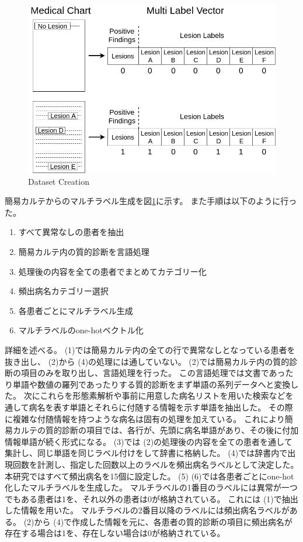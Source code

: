 \begin{figure}[tb]
    \begin{center}
        \includegraphics[width=150mm]{./fig/ieice1.png}
        \caption{Dataset Creation}
        \label{fig:multilabel}
    \end{center}
\end{figure}

簡易カルテからのマルチラベル生成を図\ref{fig:multilabel}に示す。
また手順は以下のように行った。

\begin{enumerate}
    \item すべて異常なしの患者を抽出
    \item 簡易カルテ内の質的診断を言語処理
    \item 処理後の内容を全ての患者でまとめてカテゴリー化
    \item 頻出病名カテゴリー選択
    \item 各患者ごとにマルチラベル生成
    \item マルチラベルのone-hotベクトル化
\end{enumerate}

詳細を述べる。
 (1)では簡易カルテ内の全ての行で異常なしとなっている患者を抜き出し、 (2)から (4)の処理には通していない。
 (2)では簡易カルテ内の質的診断の項目のみを取り出し、言語処理を行った。
この言語処理では文書であったり単語や数値の羅列であったりする質的診断をまず単語の系列データへと変換した。
次にこれらを形態素解析\cite{MeCab}や事前に用意した病名リストを用いた検索などを通して病名を表す単語とそれらに付随する情報を示す単語を抽出した。
その際に複雑な付随情報を持つような病名は固有の処理を加えている。
これにより簡易カルテの質的診断の項目では、各行が、先頭に病名単語があり、その後に付加情報単語が続く形式になる。
(3)では (2)の処理後の内容を全ての患者を通して集計し、同じ単語を同じラベル付けをして辞書に格納した。 
(4)では辞書内で出現回数を計測し、指定した回数以上のラベルを頻出病名ラベルとして決定した。
本研究ではすべて頻出病名を15個に設定した。
 (5) (6)では各患者ごとにone-hot化したマルチラベルを生成した。
マルチラベルの1番目のラベルには異常が一つでもある患者は1を、それ以外の患者は0が格納されている。
これには (1)で抽出した情報を用いた。
マルチラベルの2番目以降のラベルには頻出病名ラベルがある。 
(2)から (4)で作成した情報を元に、各患者の質的診断の項目に頻出病名が存在する場合は1を、存在しない場合は0が格納されている。
